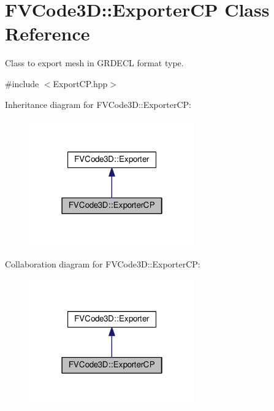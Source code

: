 \hypertarget{classFVCode3D_1_1ExporterCP}{}\section{F\+V\+Code3D\+:\+:Exporter\+CP Class Reference}
\label{classFVCode3D_1_1ExporterCP}


Class to export mesh in G\+R\+D\+E\+CL format type.  




{\ttfamily \#include $<$Export\+C\+P.\+hpp$>$}



Inheritance diagram for F\+V\+Code3D\+:\+:Exporter\+CP\+:
\nopagebreak
\begin{figure}[H]
\begin{center}
\leavevmode
\includegraphics[width=202pt]{classFVCode3D_1_1ExporterCP__inherit__graph}
\end{center}
\end{figure}


Collaboration diagram for F\+V\+Code3D\+:\+:Exporter\+CP\+:
\nopagebreak
\begin{figure}[H]
\begin{center}
\leavevmode
\includegraphics[width=202pt]{classFVCode3D_1_1ExporterCP__coll__graph}
\end{center}
\end{figure}
